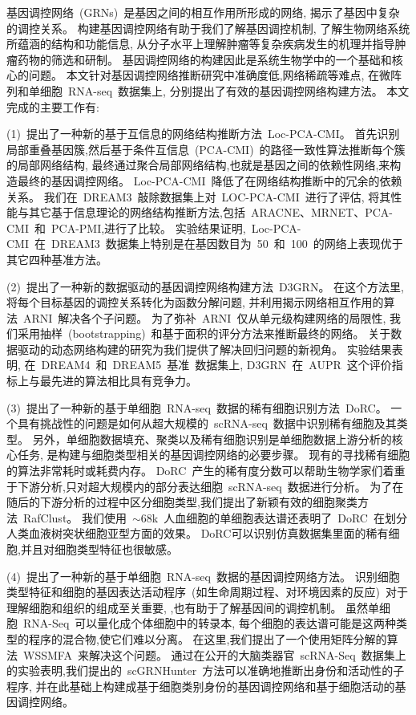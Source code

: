 \begin{abstractcn}
基因调控网络~(GRNs)~是基因之间的相互作用所形成的网络,
揭示了基因中复杂的调控关系。
构建基因调控网络有助于我们了解基因调控机制,
了解生物网络系统所蕴涵的结构和功能信息,
从分子水平上理解肿瘤等复杂疾病发生的机理并指导肿瘤药物的筛选和研制。
基因调控网络的构建因此是系统生物学中的一个基础和核心的问题。
本文针对基因调控网络推断研究中准确度低,网络稀疏等难点, 
在微阵列和单细胞~RNA-seq~数据集上, 分别提出了有效的基因调控网络构建方法。
本文完成的主要工作有:

(1)~提出了一种新的基于互信息的网络结构推断方法~Loc-PCA-CMI。
首先识别局部重叠基因簇,然后基于条件互信息~(PCA-CMI)~的路径一致性算法推断每个簇的局部网络结构,
最终通过聚合局部网络结构,也就是基因之间的依赖性网络,来构造最终的基因调控网络。
Loc-PCA-CMI~降低了在网络结构推断中的冗余的依赖关系。
我们在~DREAM3~敲除数据集上对~LOC-PCA-CMI~进行了评估,
将其性能与其它基于信息理论的网络结构推断方法,包括~ARACNE、MRNET、PCA-CMI~和~PCA-PMI,进行了比较。
实验结果证明,~Loc-PCA-CMI~在~DREAM3~数据集上特别是在基因数目为~50~和~100~的网络上表现优于其它四种基准方法。

(2)~提出了一种新的数据驱动的基因调控网络构建方法~D3GRN。
在这个方法里,将每个目标基因的调控关系转化为函数分解问题,
并利用揭示网络相互作用的算法~ARNI~解决各个子问题。
为了弥补~ARNI~仅从单元级构建网络的局限性,
我们采用抽样~(bootstrapping)~和基于面积的评分方法来推断最终的网络。
关于数据驱动的动态网络构建的研究为我们提供了解决回归问题的新视角。
实验结果表明, 在~DREAM4~和~DREAM5~基准~数据集上, D3GRN~在~AUPR~这个评价指标上与最先进的算法相比具有竞争力。

(3)~提出了一种新的基于单细胞~RNA-seq~数据的稀有细胞识别方法~DoRC。
一个具有挑战性的问题是如何从超大规模的~scRNA-seq~数据中识别稀有细胞及其类型。
另外，单细胞数据填充、聚类以及稀有细胞识别是单细胞数据上游分析的核心任务, 
是构建与细胞类型相关的基因调控网络的必要步骤。
现有的寻找稀有细胞的算法非常耗时或耗费内存。
DoRC~产生的稀有度分数可以帮助生物学家们着重于下游分析,只对超大规模内的部分表达细胞~scRNA-seq~数据进行分析。
为了在随后的下游分析的过程中区分细胞类型,我们提出了新颖有效的细胞聚类方法~RafClust。
我们使用~${\sim}68$k~人血细胞的单细胞表达谱还表明了~DoRC~在划分人类血液树突状细胞亚型方面的效果。
DoRC可以识别仿真数据集里面的稀有细胞,并且对细胞类型特征也很敏感。

(4)~提出了一种新的基于单细胞~RNA-seq~数据的基因调控网络方法。
识别细胞类型特征和细胞的基因表达活动程序~(如生命周期过程、对环境因素的反应)~对于理解细胞和组织的组成至关重要,
,也有助于了解基因间的调控机制。
虽然单细胞~RNA-Seq~可以量化成个体细胞中的转录本,
每个细胞的表达谱可能是这两种类型的程序的混合物,使它们难以分离。
在这里,我们提出了一个使用矩阵分解的算法~WSSMFA~来解决这个问题。
通过在公开的大脑类器官~scRNA-Seq~数据集上的实验表明,我们提出的~scGRNHunter~方法可以准确地推断出身份和活动性的子程序, 
并在此基础上构建成基于细胞类别身份的基因调控网络和基于细胞活动的基因调控网络。


\end{abstractcn}